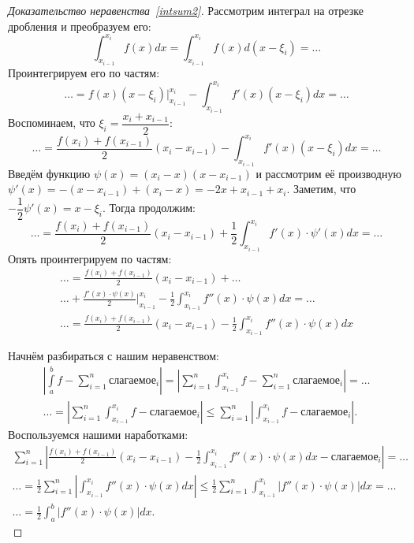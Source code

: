 \begin{proof}[Доказательство неравенства~\eqref{intsum2}]
	Рассмотрим интеграл на отрезке дробления и преобразуем его: \[
	\int_{x_{i - 1}}^{x_i} f(x) dx = \int_{x_{i - 1}}^{x_i} f(x) d(x - \xi_i) = \ldots
	\]
	Проинтегрируем его по частям: \[
	\ldots = f(x) (x - \xi_i) \bigg|_{x_{i - 1}}^{x_i} - \int_{x_{i - 1}}^{x_i} f'(x) (x - \xi_i) dx = \ldots
	\]
	Воспоминаем, что \(\xi_i = \dfrac{x_i + x_{i - 1}}{2}\): \[
	\ldots = \frac{f(x_i) + f(x_{i - 1})}{2} (x_i - x_{i - 1}) - \int_{x_{i - 1}}^{x_i} f'(x) (x - \xi_i) dx = \ldots
	\]
	Введём функцию \(\psi(x) = (x_i - x) (x - x_{i - 1})\) и рассмотрим её производную \(\psi'(x) = -(x - x_{i - 1}) + (x_i - x) = -2x + x_{i - 1} + x_i\). Заметим, что \(-\dfrac{1}{2} \psi'(x) = x - \xi_i\). Тогда продолжим: \[
	\ldots = \frac{f(x_i) + f(x_{i - 1})}{2} (x_i - x_{i - 1}) + \frac12 \int_{x_{i - 1}}^{x_i} f'(x) \cdot \psi'(x) dx = \ldots
	\]
	Опять проинтегрируем по частям:
	\begin{gather*}
		\ldots = \frac{f(x_i) + f(x_{i - 1})}{2} (x_i - x_{i - 1}) + \ldots \\
		\ldots + \frac{f'(x) \cdot \psi(x)}{2} \bigg|_{x_{i - 1}}^{x_i} - \frac{1}{2}\int_{x_{i - 1}}^{x_i} f''(x) \cdot \psi(x) dx = \ldots \\
		\ldots = \frac{f(x_i) + f(x_{i - 1})}{2} (x_i - x_{i - 1}) - \frac{1}{2}\int_{x_{i - 1}}^{x_i} f''(x) \cdot \psi(x) dx
	\end{gather*}
	
	Начнём разбираться с нашим неравенством:
	\begin{gather*}
		\left|\int\limits_a^b f - \sum_{i = 1}^n \textit{слагаемое}_i \right| = \left|\sum_{i = 1}^n \int_{x_{i - 1}}^{x_i} f - \sum_{i = 1}^n \textit{слагаемое}_i \right| = \ldots \\
		\ldots = \left|\sum_{i = 1}^n \int_{x_{i - 1}}^{x_i} f - \textit{слагаемое}_i \right| \leqslant \sum_{i = 1}^n \left|\int_{x_{i - 1}}^{x_i} f - \textit{слагаемое}_i \right|.
	\end{gather*}
	Воспользуемся нашими наработками:
	\begin{gather*}
		\sum_{i = 1}^n \left|\frac{f(x_i) + f(x_{i - 1})}{2} (x_i - x_{i - 1}) - \frac{1}{2}\int_{x_{i - 1}}^{x_i} f''(x) \cdot \psi(x) dx - \textit{слагаемое}_i \right| = \ldots \\
		\ldots = \frac{1}{2} \sum_{i = 1}^n \left|\int_{x_{i - 1}}^{x_i} f''(x) \cdot \psi(x) dx \right| \leqslant \frac{1}{2} \sum_{i = 1}^n \int_{x_{i - 1}}^{x_i} \left|f''(x) \cdot \psi(x) \right| dx = \ldots \\
		\ldots = \frac{1}{2} \int_a^b \left|f''(x) \cdot \psi(x) \right| dx.
	\end{gather*}
	

\end{proof}
